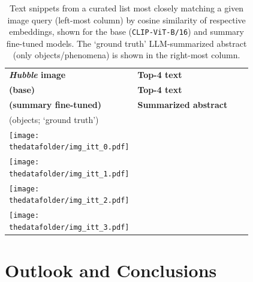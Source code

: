 \documentclass[10pt]{article} %
\newcommand{\hubble}{\emph{Hubble}\xspace}
\begin{document}
\begin{table}[h!]
  \centering
  \renewcommand{\arraystretch}{0.1}
  \begin{tabular}{m{3cm} m{3.6cm} m{3.6cm} m{4cm}}
      \toprule
      \centering \bfseries \hubble image & \centering \textbf{Top-4 text} \\ \small\textbf{\textcolor{deeppurple}{(base)}} & \centering  \textbf{Top-4 text} \\ \small\textbf{\textcolor{deepred}{(summary fine-tuned)}} & \centering \textbf{Summarized abstract} \\ (objects; `ground truth') \tabularnewline
      \midrule
      \centering \texttt{[image: \\thedatafolder/img\_itt\_0.pdf]} & \centering \scriptsize  & \centering  \scriptsize  &  {\scriptsize } \tabularnewline
      \midrule
      \centering \texttt{[image: \\thedatafolder/img\_itt\_1.pdf]} & \centering \scriptsize  & \centering  \scriptsize  &  {\scriptsize } \tabularnewline
      \midrule
      \centering \texttt{[image: \\thedatafolder/img\_itt\_2.pdf]} & \centering \scriptsize  & \centering  \scriptsize  &  {\scriptsize } \tabularnewline
      \midrule
      \centering \texttt{[image: \\thedatafolder/img\_itt\_3.pdf]} & \centering \scriptsize  & \centering  \scriptsize  &  {\scriptsize } \tabularnewline
      \bottomrule
  \end{tabular}
  \caption{Text snippets from a curated list most closely matching a given image query (left-most column) by cosine similarity of respective embeddings, shown for the \textcolor{deeppurple}{base} (\texttt{CLIP-ViT-B/16}) and \textcolor{deepred}{summary fine-tuned} models. The `ground truth' LLM-summarized abstract (only objects/phenomena) is shown in the right-most column.}
  \label{tab:itt}
\end{table}

\section{Outlook and Conclusions}
\label{sec:conclusion}
\end{document}

